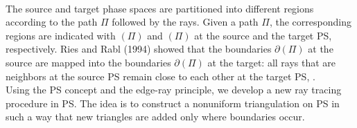 \\ \indent The source and target phase spaces are partitioned into different regions according to the path $\Pi$ followed by the rays. 
Given a path $\Pi$, the corresponding regions are indicated with $(\Pi)$ and $(\Pi)$ at the source and the target PS, respectively. 
Ries and Rabl (1994) showed that the boundaries 
$\partial$$(\Pi)$ at the source are mapped into the boundaries $\partial$$(\Pi)$ at the target: all rays that are neighbors at the source PS remain close to each other at the target PS, \cite{Ries:2}.
\\ \indent Using the PS concept and the edge-ray principle, we develop a new ray tracing procedure in PS.
The idea is to construct a nonuniform triangulation on PS in such a way that new triangles are added only where boundaries occur.

